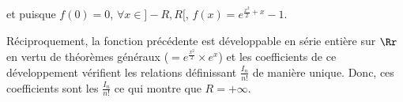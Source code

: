{{et puisque $f(0)=0$, $\forall x\in]-R,R[$, $f(x)=e^{\frac{x^2}{2}+x}-1$.

Réciproquement, la fonction précédente est développable en série entière sur $\Rr$ en vertu de théorèmes généraux ($=e^{\frac{x^2}{2}}\times e^x$) et les coefficients de ce développement vérifient les relations définissant $\frac{I_n}{n!}$ de manière unique. Donc, ces coefficients sont les $\frac{I_n}{n!}$ ce qui montre que $R = +\infty$.

\begin{center}
\end{center}
}
}
